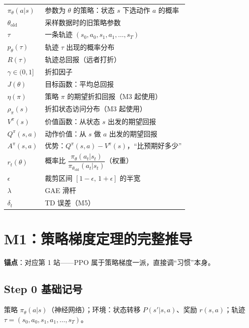 \documentclass[UTF8,12pt,a4paper]{ctexrep}
\begin{document}
\begin{center}
\small
{}
\begin{tabular}{ll}
\toprule
$\pi_\theta(a|s)$ & 参数为 $\theta$ 的策略：状态 $s$ 下选动作 $a$ 的概率\\
$\theta_{\mathrm{old}}$ & 采样数据时的旧策略参数\\
$\tau$ & 一条轨迹 $(s_0,a_0,s_1,a_1,\ldots,s_T)$\\
$p_\theta(\tau)$ & 轨迹 $\tau$ 出现的概率分布\\
$R(\tau)$ & 轨迹总回报（远者打折）\\
$\gamma \in (0,1]$ & 折扣因子\\
$J(\theta)$ & 目标函数：平均总回报\\
$\eta(\pi)$ & 策略 $\pi$ 的期望折扣回报（M3 起使用）\\
$\rho_\pi(s)$ & 折扣状态访问分布（M3 起使用）\\
$V^{\pi}(s)$ & 价值函数：从状态 $s$ 出发的期望回报\\
$Q^{\pi}(s,a)$ & 动作价值：从 $s$ 做 $a$ 出发的期望回报\\
$A^{\pi}(s,a)$ & 优势：$Q^{\pi}(s,a)-V^{\pi}(s)$，``比预期好多少''\\
$r_t(\theta)$ & 概率比 $\dfrac{\pi_\theta(a_t|s_t)}{\pi_{\theta_{\mathrm{old}}}(a_t|s_t)}$（权重）\\
$\epsilon$ & 裁剪区间 $[1-\epsilon,\,1+\epsilon]$ 的半宽\\
$\lambda$ & GAE 滑杆\\
$\delta_t$ & TD 误差（M5）\\
\bottomrule
\end{tabular}
\end{center}

\section{M1：策略梯度定理的完整推导}

\textbf{锚点}：对应第 1 站——PPO 属于策略梯度一派，直接调``习惯''本身。

\subsection*{Step 0 \; 基础记号}

策略 $\pi_\theta(a|s)$（神经网络）；环境：状态转移 $P(s'|s,a)$、奖励 $r(s,a)$；轨迹 $\tau = (s_0,a_0,s_1,a_1,\ldots,s_T)$。
\end{document}
